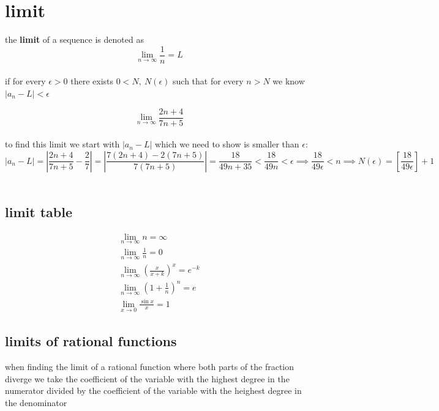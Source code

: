 \documentclass[a4paper,12pt]{article}
\newcommand{\?}{\stackrel{?}{=}}
\begin{document}
\section{limit}
\label{sec:org8cc3125}
\begin{definition}
the \textbf{limit} of a sequence is denoted as\\[0pt]
\[
  \lim_{n\to\infty} \frac1n = L
\]\\[0pt]
if for every \(\epsilon > 0\) there exists \(0 < N,\ N(\epsilon)\) such that for every \(n > N\) we know \(|a_n-L| < \epsilon\)\\[0pt]

\begin{my_example}
\[
  \lim_{n\to\infty} \frac{2n+4}{7n+5}
\]\\[0pt]
to find this limit we start with \(|a_n-L|\) which we need to show is smaller than \(\epsilon\):\\[0pt]
\[ |a_n - L| = \left|\frac{2n+4}{7n+5} - \frac27\right| = \left|\frac{7(2n+4)-2(7n+5)}{7(7n+5)}\right| = \frac{18}{49n+35} < \frac{18}{49n} < \epsilon \implies \frac{18}{49\epsilon} < n \implies N(\epsilon) = \left[\frac{18}{49\epsilon}\right]+1 \]\\[0pt]
\end{my_example}
\end{definition}
\subsection{limit table}
\label{sec:orgf881106}
\begin{gather}
  \lim_{n \to \infty} n = \infty\\
  \lim_{n \to \infty} \frac1n = 0\\
  \lim_{n \to \infty} \left(\frac{x}{x+k}\right)^x = e^{-k}\\
  \lim_{n \to \infty} \left(1+\frac{1}{n}\right)^n = e\\
  \lim_{x\to 0} \frac{\sin{x}}{x} = 1
\end{gather}
\subsection{limits of rational functions}
\label{sec:orgbd4eec8}
\begin{characteristic}
when finding the limit of a rational function where both parts of the fraction diverge we take the coefficient of the variable with the highest degree in the numerator divided by the coefficient of the variable with the heighest degree in the denominator\\[0pt]
\end{characteristic}
\end{document}
